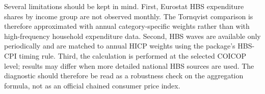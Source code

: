 Several limitations should be kept in mind. First, Eurostat HBS expenditure
shares by income group are not observed monthly. The Tornqvist comparison is
therefore approximated with annual category-specific weights rather than with
high-frequency household expenditure data. Second, HBS waves are available only
periodically and are matched to annual HICP weights using the package's HBS-CPI
timing rule. Third, the calculation is performed at the selected COICOP level;
results may differ when more detailed national HBS sources are used. The
diagnostic should therefore be read as a robustness check on the aggregation
formula, not as an official chained consumer price index.
